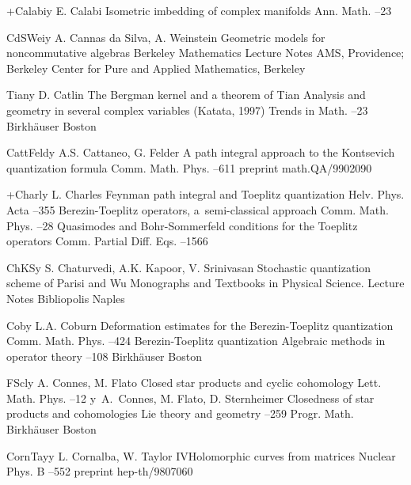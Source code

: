 \documentclass[11pt]{amsart}
\numberwithin{equation}{section}
\theoremstyle{remark}
\newcommand{\by}{\mathbf y}
\begin{document}
\begin{thebibliography}{199}
 +Calabi\by{ E. Calabi \paper Isometric imbedding of complex manifolds
\jour Ann. Math.   --23}

 CdSWei\by{ A. Cannas da Silva, A. Weinstein \book Geometric models for
noncommutative algebras \bookinfo Berkeley Mathematics Lecture Notes 
\publ AMS, Providence; Berkeley Center for Pure and Applied Mathematics,
Berkeley }

 Tian\by{ D. Catlin \paper The Bergman kernel and a theorem of Tian
\inbook Analysis and geometry in several complex variables (Katata, 1997)
\bookinfo Trends in Math. --23 \publ Birkh\"auser \publaddr Boston
}

 CattFeld\by{ A.S. Cattaneo, G. Felder \paper A path integral approach to
the Kontsevich quantization formula \jour Comm. Math. Phys.  
--611 \paperinfo preprint math.QA/9902090}

 +Charl\by{ L. Charles \paper Feynman path integral and Toeplitz
quantization \jour Helv. Phys. Acta   --355 \moreref
\paper Berezin-Toeplitz operators, a~semi-classical approach \jour Comm. Math.
Phys.   --28 \moreref \paper Quasimodes and
Bohr-Sommerfeld conditions for the Toeplitz operators \jour Comm. Partial Diff.
Eqs.   --1566}

 ChKS\by{ S. Chaturvedi, A.K. Kapoor, V. Srinivasan \book Stochastic
quantization scheme of Parisi and Wu \bookinfo Monographs and Textbooks in
Physical Science. Lecture Notes  \publ Bibliopolis \publaddr Naples }

 Cob\by{ L.A. Coburn \paper Deformation estimates for the Berezin-Toeplitz
quantization \jour Comm. Math. Phys.   --424 \moreref
\paper Berezin-Toeplitz quantization \inbook Algebraic methods in operator
theory --108 \publ Birkh\"auser \publaddr Boston }

 FScl\by{ A. Connes, M. Flato \paper Closed star products and cyclic
cohomology \jour Lett. Math. Phys.   --12 \moreref
\by \  A.~Connes, M. Flato, D. Sternheimer \paper Closedness of star products
and cohomologies \inbook Lie theory and geometry --259 \bookinfo
Progr. Math.  \publ Birkh\"auser \publaddr Boston }

 CornTay\by{ L. Cornalba, W. Taylor IV\paper Holomorphic curves from
matrices \jour Nuclear Phys. B   --552 \paperinfo
preprint hep-th/9807060}


\end{thebibliography}
\end{document}
